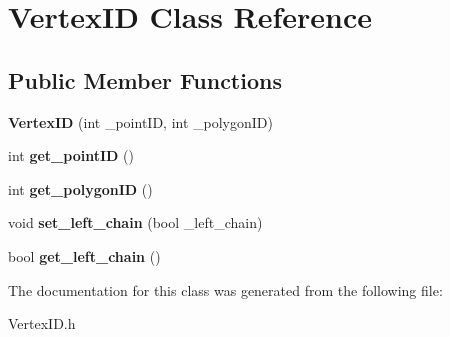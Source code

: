 \hypertarget{class_vertex_i_d}{}\section{Vertex\+ID Class Reference}
\label{class_vertex_i_d}
\subsection*{Public Member Functions}
\begin{DoxyCompactItemize}
\item 
\mbox{\label{class_vertex_i_d_a36d8ced49a29029ec170da3166e4667b}} 
{\bfseries Vertex\+ID} (int \+\_\+point\+ID, int \+\_\+polygon\+ID)
\item 
\mbox{\label{class_vertex_i_d_a21a75b29d4c40433b50911b477da811f}} 
int {\bfseries get\+\_\+point\+ID} ()
\item 
\mbox{\label{class_vertex_i_d_a18aaf5819c741c6211fa8de82a802886}} 
int {\bfseries get\+\_\+polygon\+ID} ()
\item 
\mbox{\label{class_vertex_i_d_ad2c2d0f0cb83f5c6655a7cd37ee19d39}} 
void {\bfseries set\+\_\+left\+\_\+chain} (bool \+\_\+left\+\_\+chain)
\item 
\mbox{\label{class_vertex_i_d_a28007369cb86ccb98813e96d9404aff8}} 
bool {\bfseries get\+\_\+left\+\_\+chain} ()
\end{DoxyCompactItemize}


The documentation for this class was generated from the following file\+:\begin{DoxyCompactItemize}
\item 
Vertex\+I\+D.\+h\end{DoxyCompactItemize}
